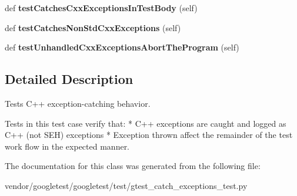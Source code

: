 \begin{DoxyCompactItemize}
def {\bfseries test\+Catches\+Cxx\+Exceptions\+In\+Test\+Body} (self)
\item 
\mbox{\label{classgtest__catch__exceptions__test_1_1_catch_cxx_exceptions_test_a922cb0b598034924c19e6695cc9f7513}} 
def {\bfseries test\+Catches\+Non\+Std\+Cxx\+Exceptions} (self)
\item 
\mbox{\label{classgtest__catch__exceptions__test_1_1_catch_cxx_exceptions_test_af3a794d5af0b3d72789293531468050a}} 
def {\bfseries test\+Unhandled\+Cxx\+Exceptions\+Abort\+The\+Program} (self)
\end{DoxyCompactItemize}


\subsection{Detailed Description}
\begin{DoxyVerb}Tests C++ exception-catching behavior.

   Tests in this test case verify that:
   * C++ exceptions are caught and logged as C++ (not SEH) exceptions
   * Exception thrown affect the remainder of the test work flow in the
     expected manner.
\end{DoxyVerb}
 

The documentation for this class was generated from the following file\+:\begin{DoxyCompactItemize}
\item 
vendor/googletest/googletest/test/gtest\+\_\+catch\+\_\+exceptions\+\_\+test.\+py\end{DoxyCompactItemize}
